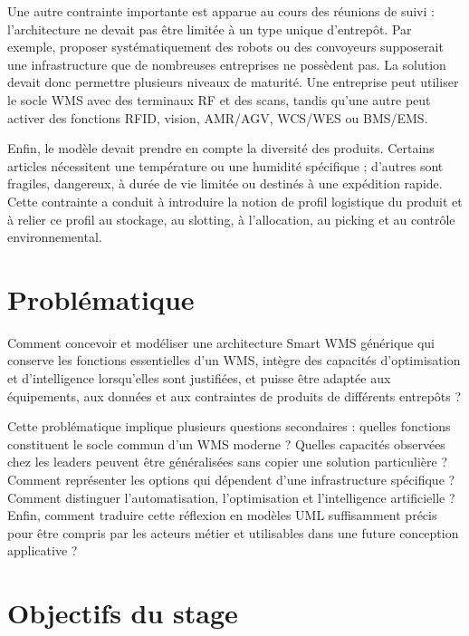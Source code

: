 Une autre contrainte importante est apparue au cours des réunions de suivi : l’architecture ne devait pas être limitée à un type unique d’entrepôt. Par exemple, proposer systématiquement des robots ou des convoyeurs supposerait une infrastructure que de nombreuses entreprises ne possèdent pas. La solution devait donc permettre plusieurs niveaux de maturité. Une entreprise peut utiliser le socle WMS avec des terminaux RF et des scans, tandis qu’une autre peut activer des fonctions RFID, vision, AMR/AGV, WCS/WES ou BMS/EMS.


Enfin, le modèle devait prendre en compte la diversité des produits. Certains articles nécessitent une température ou une humidité spécifique ; d’autres sont fragiles, dangereux, à durée de vie limitée ou destinés à une expédition rapide. Cette contrainte a conduit à introduire la notion de profil logistique du produit et à relier ce profil au stockage, au slotting, à l’allocation, au picking et au contrôle environnemental.



\section{Problématique}

\label{sec:1.6}

Comment concevoir et modéliser une architecture Smart WMS générique qui conserve les fonctions essentielles d’un WMS, intègre des capacités d’optimisation et d’intelligence lorsqu’elles sont justifiées, et puisse être adaptée aux équipements, aux données et aux contraintes de produits de différents entrepôts ?


Cette problématique implique plusieurs questions secondaires : quelles fonctions constituent le socle commun d’un WMS moderne ? Quelles capacités observées chez les leaders peuvent être généralisées sans copier une solution particulière ? Comment représenter les options qui dépendent d’une infrastructure spécifique ? Comment distinguer l’automatisation, l’optimisation et l’intelligence artificielle ? Enfin, comment traduire cette réflexion en modèles UML suffisamment précis pour être compris par les acteurs métier et utilisables dans une future conception applicative ?



\section{Objectifs du stage}

